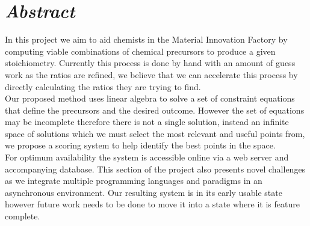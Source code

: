 \chapter*{\textit{Abstract}}
\label{sec:abstract}
\vspace*{-10mm}

In this project we aim to aid chemists in the Material Innovation Factory by computing viable combinations of chemical precursors to produce a given stoichiometry. Currently this process is done by hand with an amount of guess work as the ratios are refined, we believe that we can accelerate this process by directly calculating the ratios they are trying to find. \\

Our proposed method uses linear algebra to solve a set of constraint equations that define the precursors and the desired outcome. However the set of equations may be incomplete therefore there is not a single solution, instead an infinite space of solutions which we must select the most relevant and useful points from, we propose a scoring system to help identify the best points in the space. \\

For optimum availability the system is accessible online via a web server and accompanying database. This section of the project also presents novel challenges as we integrate multiple programming languages and paradigms in an asynchronous environment. Our resulting system is in its early usable state however future work needs to be done to move it into a state where it is feature complete.

\vspace*{20mm}